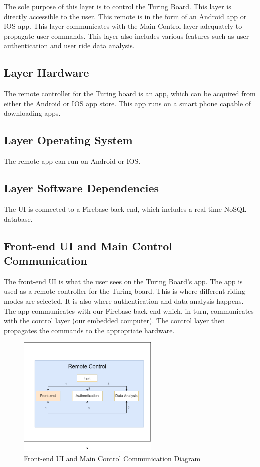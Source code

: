 The sole purpose of this layer is to control the Turing Board. This layer is directly accessible to the user. This remote is in the form of an Android app or IOS app. This layer communicates with the Main Control layer adequately to propagate user commands. This layer also includes various features such as user authentication and user ride data analysis.

\subsection{Layer Hardware}
The remote controller for the Turing board is an app, which can be acquired from either the Android or IOS app store. This app runs on a smart phone capable of downloading apps.


\subsection{Layer Operating System}
The remote app can run on Android or IOS.

\subsection{Layer Software Dependencies}
The UI is connected to a Firebase back-end, which includes a real-time NoSQL database.

\subsection{Front-end UI and Main Control Communication}
The front-end UI is what the user sees on the Turing Board's app. The app is used as a remote controller for the Turing board. This is where different riding modes are selected. It is also where authentication and data analysis happens. The app communicates with our Firebase back-end which, in turn, communicates with the control layer (our embedded computer). The control layer then propagates the commands to the appropriate hardware.

\begin{figure}[h!]
	\centering
 	\includegraphics[width=0.60\textwidth]{images/UIJetsonCom.png} %
 \caption{Front-end UI and Main Control Communication Diagram} %
\end{figure}

